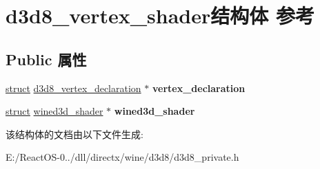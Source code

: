 \hypertarget{structd3d8__vertex__shader}{}\section{d3d8\+\_\+vertex\+\_\+shader结构体 参考}
\label{structd3d8__vertex__shader}
\subsection*{Public 属性}
\begin{DoxyCompactItemize}
\item 
\mbox{\label{structd3d8__vertex__shader_ace65731be1eae942bbd67ec00d7b6835}} 
\hyperlink{interfacestruct}{struct} \hyperlink{structd3d8__vertex__declaration}{d3d8\+\_\+vertex\+\_\+declaration} $\ast$ {\bfseries vertex\+\_\+declaration}
\item 
\mbox{\label{structd3d8__vertex__shader_a215e1ebf77d8c4cba6e6565bfe78e060}} 
\hyperlink{interfacestruct}{struct} \hyperlink{structwined3d__shader}{wined3d\+\_\+shader} $\ast$ {\bfseries wined3d\+\_\+shader}
\end{DoxyCompactItemize}


该结构体的文档由以下文件生成\+:\begin{DoxyCompactItemize}
\item 
E\+:/\+React\+O\+S-\/0../dll/directx/wine/d3d8/d3d8\+\_\+private.\+h\end{DoxyCompactItemize}
